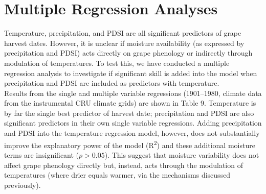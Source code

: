 \documentclass[12pt]{article}
\begin{document}
\section*{Multiple Regression Analyses}
\noindent Temperature, precipitation, and PDSI are all significant predictors of grape harvest dates. However, it is unclear if moisture availability (as expressed by precipitation and PDSI) acts directly on grape phenology or indirectly through modulation of temperatures. To test this, we have conducted a multiple regression analysis to investigate if significant skill is added into the model when precipitation and PDSI are included as predictors with temperature.\\
\indent Results from the single and multiple variable regressions (1901--1980, climate data from the instrumental CRU climate grids) are shown in Table 9. Temperature is by far the single best predictor of harvest date; precipitation and PDSI are also significant predictors in their own single variable regressions. Adding precipitation and PDSI into the temperature regression model, however, does not substantially improve the explanatory power of the model (R\textsuperscript{2}) and these additional moisture terms are insignificant ($p>0.05$). This suggest that moisture variability does not affect grape phenology directly but, instead, acts through the modulation of temperatures (where drier equals warmer, via the mechanisms discussed previously).

\pagebreak

\end{document}
